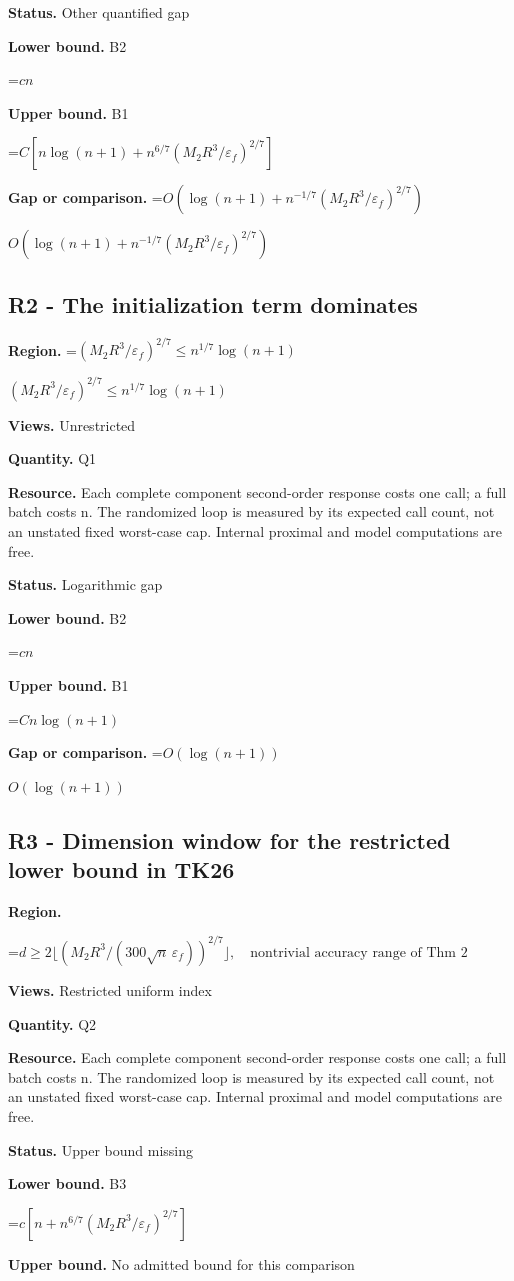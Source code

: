 \documentclass[10pt,a4paper]{article}
\newcommand{\AtlasMath}[1]{\par\begingroup\centering\setbox0=\hbox{$\displaystyle #1$}\ifdim\wd0>1.4\linewidth\typeout{ATLAS WIDE FORMULA: \the\wd0}\fi\ifdim\wd0>\linewidth\resizebox{\linewidth}{!}{\box0}\else\box0\fi\par\endgroup}
\newcommand{\AtlasInlineMath}[1]{\begingroup\setbox0=\hbox{$#1$}\ifdim\wd0>.4\linewidth\endgroup\AtlasMath{#1}\else\endgroup$#1$\fi}
\begin{document}
\textbf{Status.} Other quantified gap

\textbf{Lower bound.} B2

\AtlasMath{cn}
\textbf{Upper bound.} B1

\AtlasMath{C[n\log(n+1)+n^{6/7}(M_2R^3/\varepsilon_f)^{2/7}]}
\textbf{Gap or comparison.} \AtlasInlineMath{O(\log(n+1)+n^{-1/7}(M_2R^3/\varepsilon_f)^{2/7})}

\subsection{R2 - The initialization term dominates}
\textbf{Region.} \AtlasInlineMath{(M_2R^3/\varepsilon_f)^{2/7}\le n^{1/7}\log(n+1)}

\textbf{Views.} Unrestricted

\textbf{Quantity.} Q1

\textbf{Resource.} Each complete component second-order response costs one call; a full batch costs n. The randomized loop is measured by its expected call count, not an unstated fixed worst-case cap. Internal proximal and model computations are free.

\textbf{Status.} Logarithmic gap

\textbf{Lower bound.} B2

\AtlasMath{cn}
\textbf{Upper bound.} B1

\AtlasMath{Cn\log(n+1)}
\textbf{Gap or comparison.} \AtlasInlineMath{O(\log(n+1))}

\subsection{R3 - Dimension window for the restricted lower bound in TK26}
\textbf{Region.} 
\AtlasMath{d\ge2\lfloor(M_2R^3/(300\sqrt n\,\varepsilon_f))^{2/7}\rfloor,\quad\text{nontrivial accuracy range of Thm 2}}


\textbf{Views.} Restricted uniform index

\textbf{Quantity.} Q2

\textbf{Resource.} Each complete component second-order response costs one call; a full batch costs n. The randomized loop is measured by its expected call count, not an unstated fixed worst-case cap. Internal proximal and model computations are free.

\textbf{Status.} Upper bound missing

\textbf{Lower bound.} B3

\AtlasMath{c[n+n^{6/7}(M_2R^3/\varepsilon_f)^{2/7}]}
\textbf{Upper bound.} No admitted bound for this comparison
\end{document}
